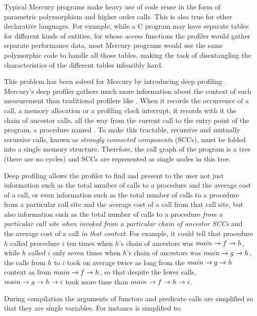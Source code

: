 Typical Mercury programs make heavy use of code reuse in the form of
parametric polymorphism and higher order calls.
This is also true for other declarative languages.
For example, while a C program may have
separate tables for different kinds of entities,
for whose access functions
the profiler would gather separate performance data,
most Mercury programs would use
the same polymorphic code to handle all those tables,
making the task of disentangling the characteristics of the different tables
infeasibly hard.

This problem has been solved for Mercury by introducing deep profiling
\citep{conway:2001:mercury-deep}.
Mercury's deep profiler gathers much more information about the context of
each measurement than traditional profilers like \citet{gprof}.
When it records the occurrence of a call,
a memory allocation or a profiling clock interrupt,
it records with it the chain of ancestor calls,
all the way from the current call to the entry point of the program,
a procedure named .
To make this tractable,
recursive and mutually recursive calls,
known as \emph{strongly connected components} (SCCs),
must be folded into a single memory structure.
Therefore, the call graph of the program is a tree (there are no cycles)
and SCCs are represented as single nodes in this tree.

Deep profiling allows the profiler to find and present to the user
not just information such as the total number of calls to a procedure
and the average cost of a call,
or even information such as the total number of calls to a procedure
from a particular call site and the average cost of a call from that call site,
but also information such as the total number of calls to a procedure
\emph{from a particular call site
when invoked from a particular chain of ancestor SCCs}
and the average cost of a call \emph{in that context}.
For example, it could tell that
procedure $h$ called procedure $i$ ten times
when $h$'s chain of ancestors was $main \rightarrow f \rightarrow h$,
while $h$ called $i$ only seven times
when $h$'s chain of ancestors was $main \rightarrow g \rightarrow h$,
the calls from $h$ to $i$ took on average twice as long
from the $main \rightarrow g \rightarrow h$ context as from $main \rightarrow f \rightarrow h$,
so that despite the fewer calls,
$main \rightarrow g \rightarrow h \rightarrow i$ took more time than $main \rightarrow f \rightarrow h \rightarrow i$.

During compilation the arguments of functors and predicate calls are
simplified so that they are single variables.
For instance  is simplified to:

